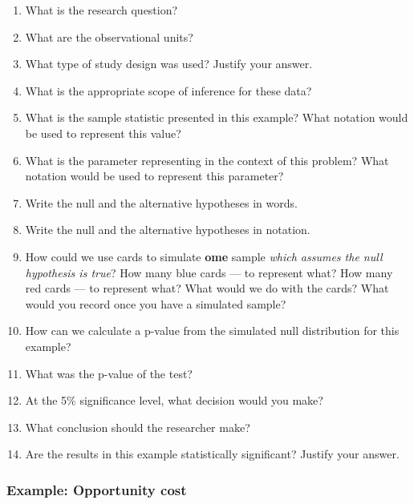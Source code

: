 \documentclass[
]{report}
\newcommand{\rgs}{\vspace{12pt}} %
\begin{document}
\begin{enumerate}
\def\labelenumi{\arabic{enumi}.}
\item
  What is the research question?
  \rgs
\item
  What are the observational units?
  \rgs
\item
  What type of study design was used? Justify your answer.
  \rgs
\item
  What is the appropriate scope of inference for these data?
  \rgs
\item
  What is the sample statistic presented in this example? What notation would be used to represent this value?
  \rgs
\item
  What is the parameter representing in the context of this problem? What notation would be used to represent this parameter?
  \rgs
  \rgs
\item
  Write the null and the alternative hypotheses in words.
  \rgs
  \rgs
\item
  Write the null and the alternative hypotheses in notation.
  \rgs
\item
  How could we use cards to simulate \textbf{ome} sample \emph{which assumes the null hypothesis is true}? How many blue cards --- to represent what? How many red cards --- to represent what? What would we do with the cards? What would you record once you have a simulated sample?
  \rgs
  \rgs
  \rgs
\item
  How can we calculate a p-value from the simulated null distribution for this example?
  \rgs
  \rgs
\item
  What was the p-value of the test?
  \rgs
\item
  At the 5\% significance level, what decision would you make?
  \rgs
\item
  What conclusion should the researcher make?
  \rgs
  \rgs
\item
  Are the results in this example statistically significant? Justify your answer.
  \rgs
\end{enumerate}

\hypertarget{example-opportunity-cost}{%
\subsubsection*{Example: Opportunity cost}\label{example-opportunity-cost}}
\end{document}
